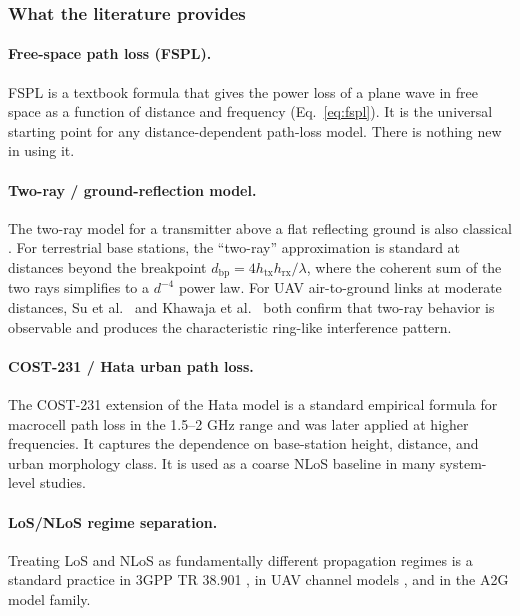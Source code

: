 \documentclass[11pt,a4paper]{article}
\begin{document}
\subsubsection{What the literature provides}

\paragraph{Free-space path loss (FSPL).}
FSPL is a textbook formula \cite{rappaport} that gives the power loss of a
plane wave in free space as a function of distance and frequency
(Eq.~\ref{eq:fspl}). It is the universal starting point for any
distance-dependent path-loss model. There is nothing new in using it.

\paragraph{Two-ray / ground-reflection model.}
The two-ray model for a transmitter above a flat reflecting ground is also
classical \cite{rappaport}. For terrestrial base stations, the
``two-ray'' approximation is standard at distances beyond the breakpoint
$d_{\mathrm{bp}} = 4 h_{\mathrm{tx}} h_{\mathrm{rx}} / \lambda$, where the
coherent sum of the two rays simplifies to a $d^{-4}$ power law. For UAV
air-to-ground links at moderate distances, Su et al.\ \cite{wocc2021} and
Khawaja et al.\ \cite{khawaja_survey} both confirm that two-ray behavior is
observable and produces the characteristic ring-like interference pattern.

\paragraph{COST-231 / Hata urban path loss.}
The COST-231 extension of the Hata model is a standard empirical formula for
macrocell path loss in the 1.5--2 GHz range and was later applied at higher
frequencies. It captures the dependence on base-station height, distance, and
urban morphology class. It is used as a coarse NLoS baseline in many
system-level studies.

\paragraph{LoS/NLoS regime separation.}
Treating LoS and NLoS as fundamentally different propagation regimes is a
standard practice in 3GPP TR 38.901 \cite{tr38901}, in UAV channel models
\cite{khawaja_survey}, and in the A2G model family.
\end{document}
